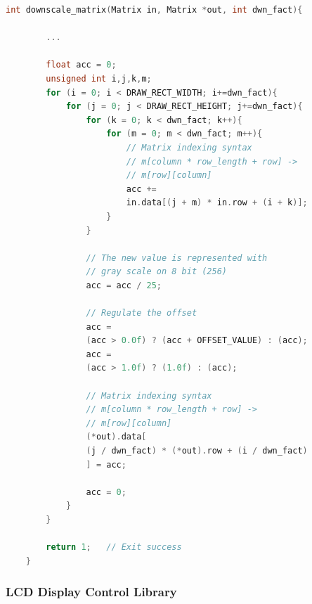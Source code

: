 \begin{lstlisting}[language=C, caption={Matrix downscaling}, label={lst:Matrix_dowscale}, morekeywords={Matrix,\#include,\#define,\#ifdef,\#ifndef,\#else,\#endif}, alsoletter={\#}]
    int downscale_matrix(Matrix in, Matrix *out, int dwn_fact){
        
        ...
        
        float acc = 0;
        unsigned int i,j,k,m;
        for (i = 0; i < DRAW_RECT_WIDTH; i+=dwn_fact){
            for (j = 0; j < DRAW_RECT_HEIGHT; j+=dwn_fact){
                for (k = 0; k < dwn_fact; k++){
                    for (m = 0; m < dwn_fact; m++){
                        // Matrix indexing syntax
                        // m[column * row_length + row] -> 
                        // m[row][column]
                        acc += 
                        in.data[(j + m) * in.row + (i + k)];
                    }
                }
        
                // The new value is represented with 
                // gray scale on 8 bit (256)
                acc = acc / 25;
        
                // Regulate the offset
                acc = 
                (acc > 0.0f) ? (acc + OFFSET_VALUE) : (acc);
                acc = 
                (acc > 1.0f) ? (1.0f) : (acc);

                // Matrix indexing syntax
                // m[column * row_length + row] -> 
                // m[row][column]
                (*out).data[
                (j / dwn_fact) * (*out).row + (i / dwn_fact)
                ] = acc;
        
                acc = 0;
            }
        }
        
        return 1;   // Exit success
    }
\end{lstlisting}



\newpage
\subsubsection{LCD Display Control Library}


